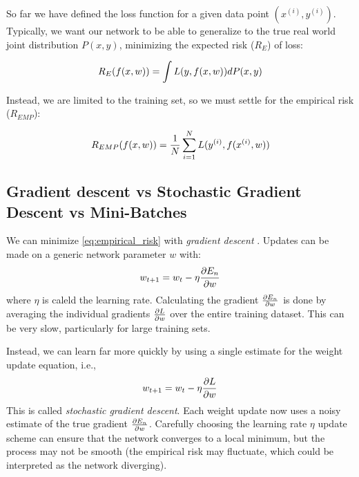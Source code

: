 So far we have defined the loss function for a given data point $(x^{(i)},
y^{(i)})$. Typically, we want our network to be able to generalize to the true
real world joint distribution $P(x,y)$, minimizing the expected risk ($R_E$) of
loss:

\begin{equation}
  R_E(f(x,w)) = \int L(y,f(x,w)) dP(x,y)
\end{equation}

Instead, we are limited to the training set, so we must settle for the
empirical risk ($R_{EMP}$):

\begin{equation}
  R_{EMP}(f(x,w)) = \frac{1}{N} \sum_{i=1}^{N} L( y^{(i)},f(x^{(i)}, w))
  \label{eq:empirical_risk}
\end{equation}

\subsection{Gradient descent vs Stochastic Gradient Descent vs Mini-Batches}
  We can minimize \autoref{eq:empirical_risk} with \emph{gradient descent}
  \citep{rumelhart_parallel_1986}. Updates can be made on a generic network
  parameter $w$ with:
  \begin{equation}
    w_{t+1} = w_{t} - \eta \frac{\partial E_n}{\partial w}
  \end{equation}
  where $\eta$ is caleld the learning rate. Calculating the gradient
  $\frac{\partial E_n}{\partial w}$ is done by averaging the individual gradients
  $\frac{\partial L}{\partial w}$ over the entire training dataset. This can be very slow,
  particularly for large training sets.
  
  Instead, we can learn far more quickly by using a single estimate for the
  weight update equation, i.e., 
  \begin{equation}
    w_{t+1} = w_{t} - \eta \frac{\partial L}{\partial w}
  \end{equation}
  This is called \emph{stochastic gradient descent}. Each weight update now
  uses a noisy estimate of the true gradient $\frac{\partial E_n}{\partial w}$. Carefully
  choosing the learning rate $\eta$ update scheme can ensure that the network
  converges to a local minimum, but the process may not be smooth (the
  empirical risk may fluctuate, which could be interpreted as the network
  diverging).

